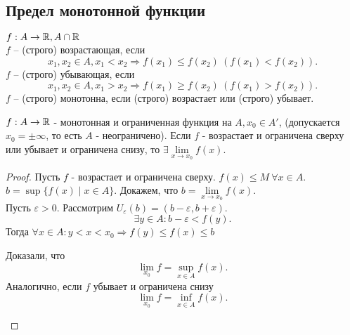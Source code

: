 \documentclass[12pt]{report}
\begin{document}
\subsection{Предел монотонной функции}\label{ques_25}
\begin{defn}
    $f:A \to \mathbb{R}, A \cap \mathbb{R}$ \\
    $f$ -- (строго) возрастающая, если \[
	x_1, x_2 \in A, x_1 <x_2 \Rightarrow f(x_1) \le f(x_2) ~ (f(x_1) < f(x_2))
    .\] 
    $f$ -- (строго) убывающая, если \[
	x_1, x_2 \in A, x_1 > x_2 \Rightarrow f(x_1) \ge f(x_2) ~ (f(x_1) > f(x_2))
    .\] 
    $f$ -- (строго) монотонна, если (строго) возрастает или (строго) убывает.
\end{defn}
\begin{thm}
    $f: A \to \mathbb{R}$ - монотонная и ограниченная функция на $A, x_0 \in A'$, (допускается $x_0 = \pm \infty$, то есть $A$ - неограничено).
    Если $f$ - возрастает и ограничена сверху или убывает и ограничена снизу, то $\exists \lim\limits_{x \to x_0} f(x)$.
\end{thm}
\begin{proof}
    Пусть $f$ - возрастает и ограничена сверху. $f(x) \le  M ~ \forall x \in A$.\\
    $b = \sup \{f(x) \mid x \in A\}$. Докажем, что $b = \lim\limits_{x \to x_0} f(x)$. \\
    Пусть $\varepsilon  > 0$. Рассмотрим $U_{\varepsilon } (b) = (b-\varepsilon , b+\varepsilon )$. 
    \[
	\exists  y \in A: b-\varepsilon < f(y)
    .\] 
    Тогда $\forall x \in A: y < x <x_0 \Rightarrow f(y) \le f(x) \le b$
    \begin{note}
	Доказали, что $$\lim_{x_0} f=\sup\limits_{x \in A} f(x).$$ Аналогично, если $f$ убывает и ограничена снизу $$\lim_{x_0} f = \inf\limits_{x \in  A}f(x).$$
    \end{note}
\end{proof}
\end{document}
